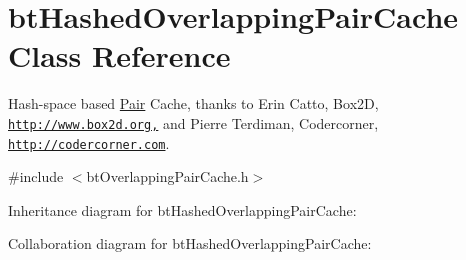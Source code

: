 \hypertarget{classbt_hashed_overlapping_pair_cache}{\section{bt\+Hashed\+Overlapping\+Pair\+Cache Class Reference}
\label{classbt_hashed_overlapping_pair_cache}
}


Hash-\/space based \hyperlink{struct_pair}{Pair} Cache, thanks to Erin Catto, Box2\+D, \href{http://www.box2d.org,}{\tt http\+://www.\+box2d.\+org,} and Pierre Terdiman, Codercorner, \href{http://codercorner.com}{\tt http\+://codercorner.\+com}.  




{\ttfamily \#include $<$bt\+Overlapping\+Pair\+Cache.\+h$>$}



Inheritance diagram for bt\+Hashed\+Overlapping\+Pair\+Cache\+:


Collaboration diagram for bt\+Hashed\+Overlapping\+Pair\+Cache\+:
